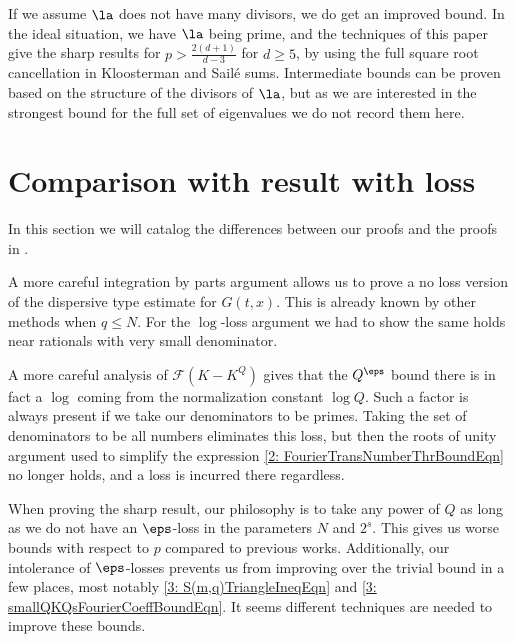 \documentclass[11pt]{amsart}
\begin{document}
\begin{remark}
If we assume $\la$ does not have many divisors, we do get an improved bound. In the ideal situation, we have $\la$ being prime, and the techniques of this paper give the sharp results for $p>\frac{2(d+1)}{d-3}$ for $d\geq 5$, by using the full square root cancellation in Kloosterman and Sail\'e sums. Intermediate bounds can be proven based on the structure of the divisors of $\la$, but as we are interested in the strongest bound for the full set of eigenvalues we do not record them here.  
\end{remark}
 
\section{Comparison with result with loss}\label{SectionComparison}
In this section we will catalog the differences between our proofs and the proofs in \cite{bourgainDemeterDiscreteRestrictImprovements2013}.

A more careful integration by parts argument allows us to prove a no loss version of the dispersive type estimate for $G(t,x)$. This is already known by other methods when $q\leq N$. For the $\log$-loss argument we had to show the same holds near rationals with very small denominator.

A more careful analysis of $\mathcal{F}(K-K^Q)$ gives that the $Q^\eps$ bound there is in fact a $\log$ coming from the normalization constant $\log Q$. Such a factor is always present if we take our denominators to be primes. Taking the set of denominators to be all numbers eliminates this loss, but then the roots of unity argument used to simplify the expression \eqref{2: FourierTransNumberThrBoundEqn} no longer holds, and a loss is incurred there regardless. 

When proving the sharp result, our philosophy is to take any power of $Q$ as long as we do not have an $\eps$-loss in the parameters $N$ and $2^s$. This gives us worse bounds with respect to $p$ compared to previous works. Additionally, our intolerance of $\eps$-losses prevents us from improving over the trivial bound in a few places, most notably \eqref{3: S(m,q)TriangleIneqEqn} and \eqref{3: smallQKQsFourierCoeffBoundEqn}. It seems different techniques are needed to improve these bounds. 


\Addresses
\end{document}
